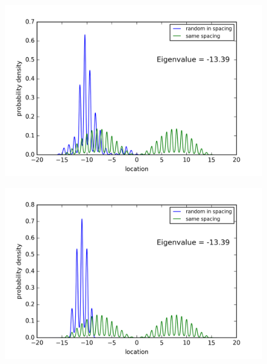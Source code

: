 \begin{figure}[!htbh]
\centering
\begin{minipage}{.45\textwidth}
  \centering
  \includegraphics[width=1.1\linewidth]{Graphics/10_0_2th_Lowest_Rand1_1.png}
  \label{fig:Area10_2thlowestRand1.1}
\end{minipage}\qquad
\begin{minipage}{.45\textwidth}
  \centering
  \includegraphics[width=1.1\linewidth]{Graphics/10_0_2th_Lowest_Rand1_5.png}
  \label{fig:Area10_2thlowestRand1.5}
\end{minipage}%
\end{figure}


\newpage
